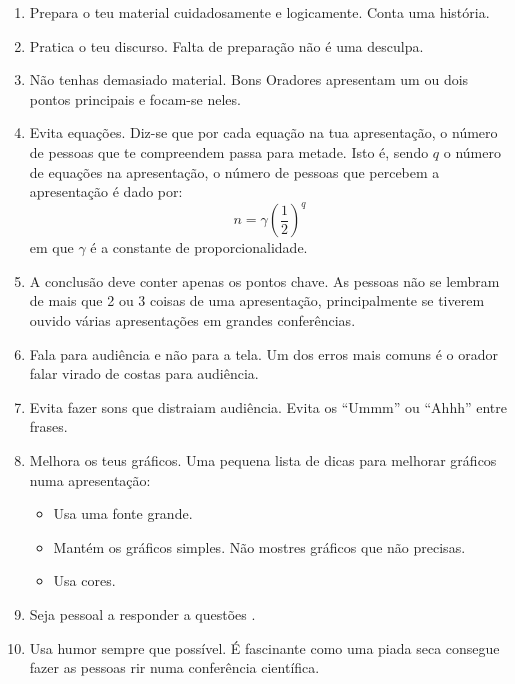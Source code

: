 \documentclass[12pt]{article}
\begin{document}
\begin{enumerate}
  \item Prepara o teu material cuidadosamente e logicamente.
  Conta uma história.
  \item Pratica o teu discurso.
  Falta de preparação não é uma desculpa.
  \item Não tenhas demasiado material.
  Bons Oradores apresentam um ou dois pontos principais e focam-se neles.
  \item Evita equações.
  Diz-se que por cada equação na tua apresentação, o número de pessoas que te compreendem passa para metade.
  Isto é, sendo $q$ o número de equações na apresentação, o número de pessoas que percebem a apresentação é dado por:
  \begin{equation}
    n = \gamma \left( \frac{1}{2} \right)^q
  \end{equation}
  em 	que $\gamma$ é a constante de proporcionalidade\cite{Valente1999,Boyce2010}.
  \item A conclusão deve conter apenas os pontos chave.
  As pessoas não se lembram de mais que 2 ou 3 coisas de uma apresentação, principalmente se tiverem ouvido várias apresentações em grandes conferências.
  \item Fala para audiência e não para a tela.
  Um dos erros mais comuns é o orador falar virado de costas para audiência.
  \item Evita fazer sons que distraiam audiência.
  Evita os ``Ummm'' ou ``Ahhh'' entre frases.
  \item Melhora os teus gráficos.
  Uma pequena lista de dicas para melhorar gráficos numa apresentação:
  \begin{itemize}
    \item Usa uma fonte grande.
    \item Mantém os gráficos simples.
    Não mostres gráficos que não precisas.
    \item Usa cores.
  \end{itemize}
  \item Seja pessoal a responder a questões \cite{Strang2013,Saviani1980}.
  \item Usa humor sempre que possível.
  É fascinante como uma piada seca consegue fazer as pessoas rir numa conferência científica.
\end{enumerate}

\printbibliography
\end{document}
